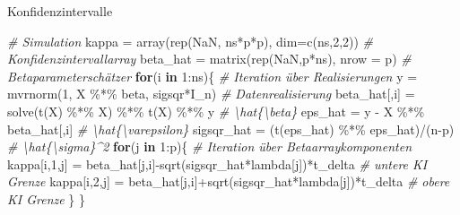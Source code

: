 \documentclass[
  8pt,
  ignorenonframetext,
]{beamer}
\newenvironment{Shaded}{\begin{snugshade}}{\end{snugshade}}
\newcommand{\AttributeTok}[1]{\textcolor[rgb]{0.77,0.63,0.00}{#1}}
\newcommand{\CommentTok}[1]{\textcolor[rgb]{0.56,0.35,0.01}{\textit{#1}}}
\newcommand{\ConstantTok}[1]{\textcolor[rgb]{0.00,0.00,0.00}{#1}}
\newcommand{\ControlFlowTok}[1]{\textcolor[rgb]{0.13,0.29,0.53}{\textbf{#1}}}
\newcommand{\DecValTok}[1]{\textcolor[rgb]{0.00,0.00,0.81}{#1}}
\newcommand{\FunctionTok}[1]{\textcolor[rgb]{0.00,0.00,0.00}{#1}}
\newcommand{\NormalTok}[1]{#1}
\newcommand{\OtherTok}[1]{\textcolor[rgb]{0.56,0.35,0.01}{#1}}
\newcommand{\SpecialCharTok}[1]{\textcolor[rgb]{0.00,0.00,0.00}{#1}}
\begin{document}
\begin{frame}[fragile]{Konfidenzintervalle}
\begin{Shaded}
\begin{Highlighting}[]
\CommentTok{\# Simulation}
\NormalTok{kappa      }\OtherTok{=} \FunctionTok{array}\NormalTok{(}\FunctionTok{rep}\NormalTok{(}\ConstantTok{NaN}\NormalTok{, ns}\SpecialCharTok{*}\NormalTok{p}\SpecialCharTok{*}\NormalTok{p), }\AttributeTok{dim=}\FunctionTok{c}\NormalTok{(ns,}\DecValTok{2}\NormalTok{,}\DecValTok{2}\NormalTok{))                 }\CommentTok{\# Konfidenzintervallarray  }
\NormalTok{beta\_hat   }\OtherTok{=} \FunctionTok{matrix}\NormalTok{(}\FunctionTok{rep}\NormalTok{(}\ConstantTok{NaN}\NormalTok{,p}\SpecialCharTok{*}\NormalTok{ns), }\AttributeTok{nrow =}\NormalTok{ p)                        }\CommentTok{\# Betaparameterschätzer}
\ControlFlowTok{for}\NormalTok{(i }\ControlFlowTok{in} \DecValTok{1}\SpecialCharTok{:}\NormalTok{ns)\{                                                     }\CommentTok{\# Iteration über Realisierungen}
\NormalTok{  y              }\OtherTok{=} \FunctionTok{mvrnorm}\NormalTok{(}\DecValTok{1}\NormalTok{, X }\SpecialCharTok{\%*\%}\NormalTok{ beta, sigsqr}\SpecialCharTok{*}\NormalTok{I\_n)               }\CommentTok{\# Datenrealisierung}
\NormalTok{  beta\_hat[,i]   }\OtherTok{=} \FunctionTok{solve}\NormalTok{(}\FunctionTok{t}\NormalTok{(X) }\SpecialCharTok{\%*\%}\NormalTok{ X) }\SpecialCharTok{\%*\%} \FunctionTok{t}\NormalTok{(X) }\SpecialCharTok{\%*\%}\NormalTok{ y                 }\CommentTok{\# \textbackslash{}hat\{\textbackslash{}beta\}}
\NormalTok{  eps\_hat        }\OtherTok{=}\NormalTok{ y }\SpecialCharTok{{-}}\NormalTok{ X }\SpecialCharTok{\%*\%}\NormalTok{ beta\_hat[,i]                           }\CommentTok{\# \textbackslash{}hat\{\textbackslash{}varepsilon\}}
\NormalTok{  sigsqr\_hat     }\OtherTok{=}\NormalTok{ (}\FunctionTok{t}\NormalTok{(eps\_hat) }\SpecialCharTok{\%*\%}\NormalTok{ eps\_hat)}\SpecialCharTok{/}\NormalTok{(n}\SpecialCharTok{{-}}\NormalTok{p)                   }\CommentTok{\# \textbackslash{}hat\{\textbackslash{}sigma\}\^{}2}
  \ControlFlowTok{for}\NormalTok{(j }\ControlFlowTok{in} \DecValTok{1}\SpecialCharTok{:}\NormalTok{p)\{                                                    }\CommentTok{\# Iteration über Betaarraykomponenten}
\NormalTok{    kappa[i,}\DecValTok{1}\NormalTok{,j] }\OtherTok{=}\NormalTok{ beta\_hat[j,i]}\SpecialCharTok{{-}}\FunctionTok{sqrt}\NormalTok{(sigsqr\_hat}\SpecialCharTok{*}\NormalTok{lambda[j])}\SpecialCharTok{*}\NormalTok{t\_delta }\CommentTok{\# untere KI Grenze}
\NormalTok{    kappa[i,}\DecValTok{2}\NormalTok{,j] }\OtherTok{=}\NormalTok{ beta\_hat[j,i]}\SpecialCharTok{+}\FunctionTok{sqrt}\NormalTok{(sigsqr\_hat}\SpecialCharTok{*}\NormalTok{lambda[j])}\SpecialCharTok{*}\NormalTok{t\_delta }\CommentTok{\# obere  KI Grenze}
\NormalTok{  \}}
\NormalTok{\}}
\end{Highlighting}
\end{Shaded}
\end{frame}
\end{document}
